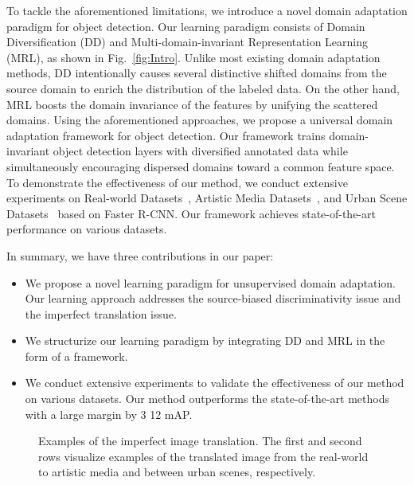 \documentclass[10pt,twocolumn,letterpaper]{article}
\begin{document}
To tackle the aforementioned limitations, we introduce a novel domain adaptation paradigm for object detection.
Our learning paradigm consists of Domain Diversification (DD) and Multi-domain-invariant Representation Learning (MRL), as shown in Fig.~\ref{fig:Intro}.
Unlike most existing domain adaptation methods, DD intentionally causes several distinctive shifted domains from the source domain to enrich the distribution of the labeled data.
On the other hand, MRL boosts the domain invariance of the features by unifying the scattered domains.
Using the aforementioned approaches, we propose a universal domain adaptation framework for object detection.
Our framework trains domain-invariant object detection layers with diversified annotated data while simultaneously encouraging dispersed domains toward a common feature space. 
To demonstrate the effectiveness of our method, we conduct extensive experiments on Real-world Datasets~\cite{PascalVoc}, Artistic Media Datasets~\cite{Inoue_2018_CVPR}, and Urban Scene Datasets~\cite{CityscapesDataset, Foggy} based on Faster R-CNN.
Our framework achieves state-of-the-art performance on various datasets.

In summary, we have three contributions in our paper:
\begin{itemize} 
    \item We propose a novel learning paradigm for unsupervised domain adaptation. Our learning approach addresses the source-biased discriminativity issue and the imperfect translation issue.
    \item We structurize our learning paradigm by integrating DD and MRL in the form of a framework. 
    \item We conduct extensive experiments to validate the effectiveness of our method on various datasets.
    Our method outperforms the state-of-the-art methods with a large margin by 3  12 mAP.
\end{itemize}
\begin{figure}[t]
\begin{center}
\vskip -2pt\end{center}\vskip -3pt
  \caption{Examples of the imperfect image translation. The first and second rows visualize examples of the translated image from the real-world to artistic media and between urban scenes, respectively.}
\label{fig:fig2}
\vskip -3pt
\end{figure}
\end{document}
